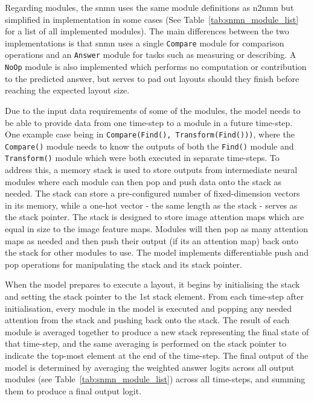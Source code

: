 Regarding modules, the \gls{snmn} uses the same module definitions as \gls{n2nmn} but simplified in implementation in some cases (See Table~\ref{tab:snmn_module_list} for a list of all implemented modules).
The main differences between the two implementations is that \gls{snmn} uses a single \texttt{Compare} module for comparison operations and an \texttt{Answer} module for tasks such as measuring or describing.
A \texttt{NoOp} module is also implemented which performs no computation or contribution to the predicted answer, but serves to pad out layouts should they finish before reaching the expected layout size.

Due to the input data requirements of some of the modules, the model needs to be able to provide data from one time-step to a module in a future time-step.
One example case being in \texttt{Compare(Find(), Transform(Find()))}, where the \texttt{Compare()} module needs to know the outputs of both the \texttt{Find()} module and \texttt{Transform()} module which were both executed in separate time-steps.
To address this, a memory stack is used to store outputs from intermediate neural modules where each module can then pop and push data onto the stack as needed.
The stack can store a pre-configured number of fixed-dimension vectors in its memory, while a one-hot vector - the same length as the stack - serves as the stack pointer.
The stack is designed to store image attention maps which are equal in size to the image feature maps.
Modules will then pop as many attention maps as needed and then push their output (if its an attention map) back onto the stack for other modules to use.
The model implements differentiable push and pop operations for manipulating the stack and its stack pointer.

When the model prepares to execute a layout, it begins by initialising the stack and setting the stack pointer to the 1st stack element.
From each time-step after initialisation, every module in the model is executed and popping any needed attention from the stack and pushing back onto the stack.
The result of each module is averaged together to produce a new stack representing the final state of that time-step, and the same averaging is performed on the stack pointer to indicate the top-most element at the end of the time-step.
The final output of the model is determined by averaging the weighted answer \glspl{logit} across all output modules (see Table~\ref{tab:snmn_module_list}) across all time-steps, and summing them to produce a final output \gls{logit}.

